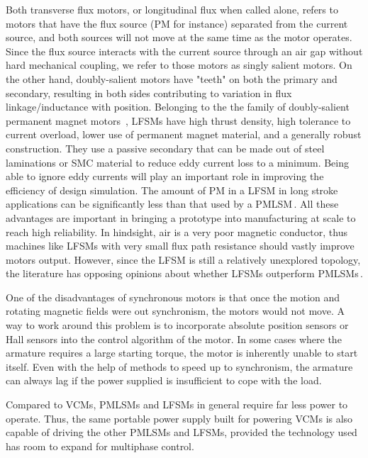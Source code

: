         
        Both transverse flux motors, or longitudinal flux when called alone, refers to motors that have the flux source (\acs{PM} for instance) separated from the current source, and both sources will not move at the same time as the motor operates. Since the flux source interacts with the current source through an air gap without hard mechanical coupling, we refer to those motors as singly salient motors. On the other hand, doubly-salient motors have "teeth" on both the primary and secondary, resulting in both sides contributing to variation in flux linkage/inductance with position. Belonging  to  the  the  family of doubly-salient permanent magnet motors \,\cite{Cheng2011}, \acp{LFSM} have high  thrust  density, high  tolerance  to  current  overload, lower use  of  permanent  magnet  material,  and  a generally robust construction. They use a passive secondary that can be made out of steel laminations or \ac{SMC} material to reduce eddy current loss to a minimum. Being  able  to ignore eddy currents will play an important role in improving the efficiency of design simulation. The amount of \acs{PM} in a \acs{LFSM} in long stroke applications can be significantly less than that used by a \acs{PMLSM}\,\cite{Aleksandrov2018}. All these advantages are important in bringing a  prototype into manufacturing at scale to reach high reliability. In hindsight, air is a very poor magnetic conductor, thus machines like \acsp{LFSM} with very small flux path resistance should vastly improve motors output. However, since the \acs{LFSM} is still a relatively unexplored topology, the literature has opposing opinions about whether \acsp{LFSM} outperform \acsp{PMLSM}\,\cite{Aleksandrov2018,Wang2008}.
        
        
        One of the disadvantages of synchronous motors is that once the motion and rotating magnetic fields were out synchronism, the motors would not move. A way to work around this problem is to incorporate absolute position sensors or Hall sensors into the control algorithm of the motor. In some cases where the armature requires a large starting torque, the motor is inherently unable to start itself. Even with the help of methods to speed up to synchronism, the armature can always lag if the power supplied is insufficient to cope with the load.
        
        
        Compared to \acsp{VCM}, \acsp{PMLSM} and \acsp{LFSM} in general require far less power to operate. Thus, the same portable power supply built for powering \acsp{VCM} is also capable of driving the other \acsp{PMLSM} and \acsp{LFSM}, provided the technology used has room to expand for multiphase control.
        
